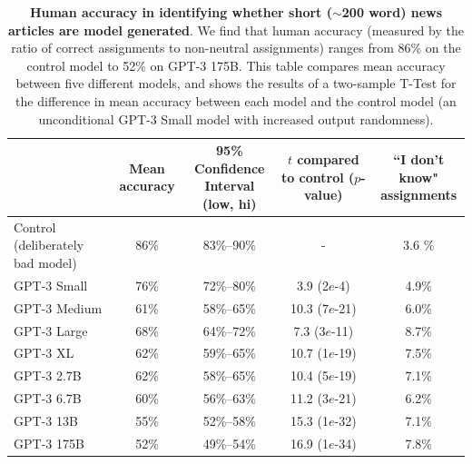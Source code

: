 \begin{table}
    \centering
        \begin{tabular}{l c c c c}
        \toprule
         & Mean accuracy & \shortstack{95\% Confidence \\Interval (low, hi)} & \shortstack{$t$ compared to \\ control ($p$-value)} & \shortstack{``I don't know" \\ assignments} \\ 
        \midrule
Control (deliberately bad model) & 86\% & 83\%–90\% & - & 3.6 \% \\ 
GPT-3 Small  & 76\% & 72\%–80\% & 3.9 (2$e$-4) & 4.9\% \\ 
GPT-3 Medium & 61\% & 58\%–65\% & 10.3 (7$e$-21) & 6.0\% \\ 
GPT-3 Large  & 68\% & 64\%–72\% & 7.3 (3$e$-11) & 8.7\% \\ 
GPT-3 XL     & 62\% & 59\%–65\% & 10.7 (1$e$-19) & 7.5\% \\ 
GPT-3 2.7B   & 62\% & 58\%–65\% & 10.4 (5$e$-19) & 7.1\% \\ 
GPT-3 6.7B   & 60\% & 56\%–63\% &  11.2 (3$e$-21) & 6.2\% \\ 
GPT-3 13B    & 55\% & 52\%–58\% &  15.3 (1$e$-32) & 7.1\% \\ 
GPT-3 175B   & 52\% & 49\%–54\% & 16.9 (1$e$-34) & 7.8\% \\ 
        \bottomrule
        \end{tabular}
    \caption{\textbf{Human accuracy in identifying whether short ($\sim$200 word) news articles are model generated}. We find that human accuracy (measured by the ratio of correct assignments to non-neutral assignments) ranges from 86\% on the control model to 52\% on GPT-3 175B. This table compares mean accuracy between five different models, and shows the results of a two-sample T-Test for the difference in mean accuracy between each model and the control model (an unconditional GPT-3 Small model with increased output randomness).}
    \label{table:generation}
\end{table}